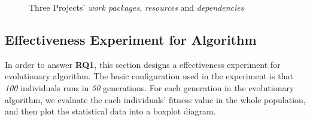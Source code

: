 \begin{figure}[!ht]
  \centering
  \caption{Three Projects' \emph{work packages}, \emph{resources} and \emph{dependencies}}
  \label{fig:dag}
\end{figure}


\subsection{Effectiveness Experiment for Algorithm}
%
In order to answer \textbf{RQ1}, this section designs a effectiveness experiment
for evolutionary algorithm. The basic configuration used in the experiment is
that \emph{100} individuals runs in \emph{50} generations. For each generation
in the evolutionary algorithm, we evaluate the each individuals' fitness value
in the whole population, and then plot the statistical data into a boxplot
diagram.


